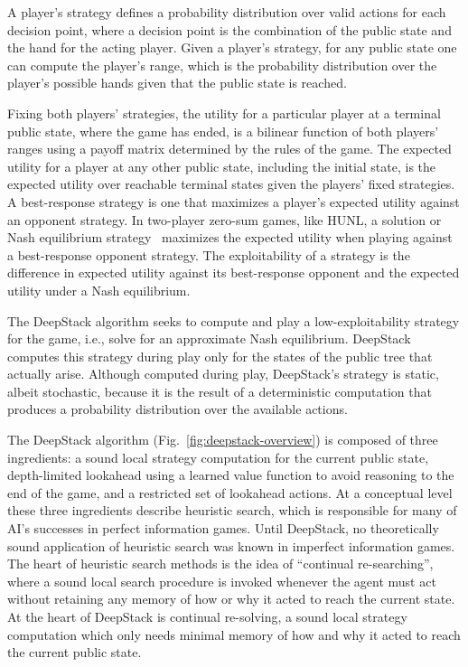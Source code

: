 \documentclass[12pt]{article}
\newcommand{\HUNL}{{HUNL}}
\begin{document}
A player's strategy defines a probability distribution over
valid actions for each decision point, where a decision point is the combination
of the public state and the hand for the acting player. Given a player's
strategy, for any public state one can compute the player's
range, which is the probability distribution over the player's
possible hands given that the public state is reached.

Fixing both players' strategies, the utility for a particular player
at a terminal public state, where the
game has ended, is a bilinear function of both players' ranges
using a payoff matrix determined by the rules of the game. The
expected utility for a player at any other public state, including the initial
state, 
is the expected utility over reachable terminal states 
given the players'
fixed strategies. A best-response strategy is one that
maximizes a player's expected utility against an opponent strategy.
In two-player zero-sum games, like \HUNL, a solution or
Nash equilibrium strategy~\cite{Nash50:equilibrium} maximizes
the expected
utility when playing against a best-response opponent strategy.
The exploitability of a strategy is the difference in expected
utility against its best-response opponent and the 
expected utility under a Nash equilibrium.  

The DeepStack algorithm seeks to compute and play a low-exploitability strategy for the game, i.e., solve for an approximate Nash equilibrium.  DeepStack computes this strategy during play only for the states of the public tree that actually arise.  Although computed during play, DeepStack's strategy is static, albeit stochastic, because it is the result of a deterministic computation that produces a probability distribution over the available actions.

The DeepStack algorithm (Fig.~\ref{fig:deepstack-overview}) is composed of three ingredients: a sound local strategy computation for the current public state, depth-limited lookahead using a learned value function to avoid reasoning to the end of the game, and a restricted set of lookahead actions.  
At a conceptual level these three ingredients describe heuristic search, which is responsible for many of AI's successes in perfect information games.
Until DeepStack, no theoretically sound application of heuristic search was known in imperfect information games.
The heart of heuristic search methods is the idea of ``continual re-searching'', where a sound local search procedure is invoked whenever the agent must act without retaining any memory of how or why it acted to reach the current state.  At the heart of DeepStack is continual re-solving, a sound local strategy computation which only needs minimal memory of how and why it acted to reach the current public state.  
 
\end{document}
